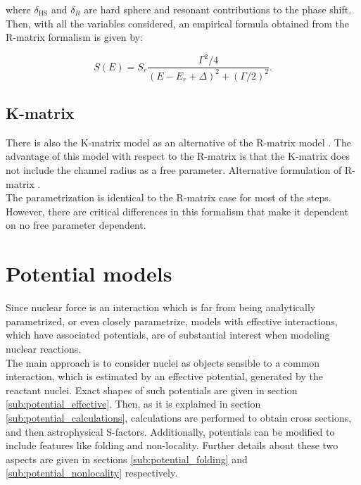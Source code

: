 \documentclass[openany]{book}
\begin{document}
where $\delta_{\mathrm{HS}}$ and $\delta_R$ are hard sphere and resonant contributions to the phase shift. \\

Then, with all the variables considered, an empirical formula obtained from the R-matrix formalism is given by:

\begin{equation} \label{eq:rmatrix_sfactor}
	S(E) = S_r \frac{\Gamma^2/4}{(E-E_r + \Delta)^2 + (\Gamma/2)^2}.
\end{equation}

\subsection{K-matrix} \label{sub:kmatrix}

There is also the K-matrix model as an alternative of the R-matrix model \cite{humblet_1990}. The advantage of this model with respect to the R-matrix is that the K-matrix does not include the channel radius as a free parameter.  Alternative formulation of R-matrix \cite{brune_2002}. \\

The parametrization is identical to the R-matrix case for most of the steps. However, there are critical differences in this formalism that make it dependent on no free parameter dependent. 

\section{Potential models} \label{sec:potentialModels}


Since nuclear force is an interaction which is far from being analytically parametrized, or even closely parametrize, models with effective interactions, which have associated potentials, are of substantial interest when modeling nuclear reactions.  \\

The main approach is to consider nuclei as objects sensible to a common interaction, which is estimated by an effective potential, generated by the reactant nuclei. Exact shapes of such potentials are given in section \ref{sub:potential_effective}. Then, as it is explained in section \ref{sub:potential_calculations}, calculations are performed to obtain cross sections, and then astrophysical S-factors. Additionally, potentials can be modified to include features like folding and non-locality. Further details about these two aspects are given in sections \ref{sub:potential_folding} and \ref{sub:potential_nonlocality} respectively.
\end{document}
